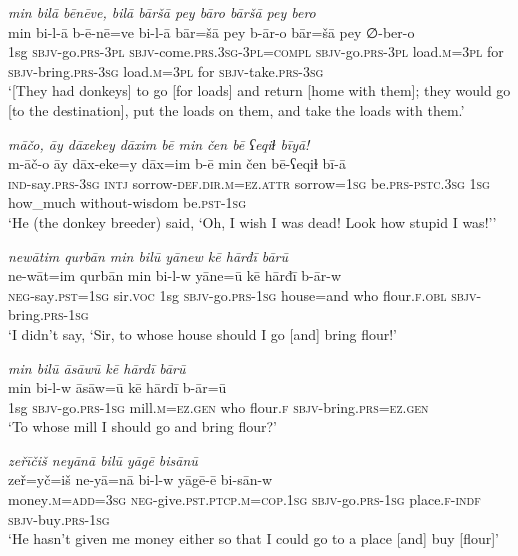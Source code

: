 \ea \label{HB.10}
\textit{min bilā bēnēve, bilā bāršā pey bāro bāršā pey bero} \\ 
\gll min bi-l-ā b-ē-nē=ve bi-l-ā bār=šā pey b-ār-o bār=šā pey ∅-ber-o \\ 
 1sg \textsc{sbjv-}go\textsc{.prs}\textsc{-3pl} \textsc{sbjv-}come\textsc{.prs}\textsc{.3sg}\textsc{-3pl}\textsc{=compl} \textsc{sbjv-}go\textsc{.prs}\textsc{-3pl} load\textsc{.m}\textsc{=3pl} for \textsc{sbjv-}bring\textsc{.prs}\textsc{-3sg} load\textsc{.m}\textsc{=3pl} for \textsc{sbjv-}take\textsc{.prs}\textsc{-3sg} \\ 
\glt `[They had donkeys] to go [for loads] and return [home with them]; they would go [to the destination], put the loads on them, and take the loads with them.'
\z 
 
\ea \label{HB.19}
\textit{māčo, āy dāxekey dāxim bē min čen bē ʕeqiɫ bīyā!} \\ 
\gll m-āč-o āy dāx-eke=y dāx=im b-ē min čen bē-ʕeqiɫ bī-ā \\ 
 \textsc{ind-}say\textsc{.prs}\textsc{-3sg} \textsc{intj} sorrow\textsc{-def}\textsc{.dir}\textsc{.m}\textsc{=ez}.\textsc{attr} sorrow\textsc{=1sg} be\textsc{.prs}\textsc{-pstc}\textsc{.3sg} \textsc{1sg} how\_much without-wisdom be\textsc{.pst}\textsc{-1sg} \\ 
\glt `He (the donkey breeder) said, ‘Oh, I wish I was dead! Look how stupid I was!’'
\z 
 
\ea \label{HB.20}
\textit{newātim qurbān min bilū yānew kē hārđī bārū} \\ 
\gll ne-wāt=im qurbān min bi-l-w yāne=ū kē hārđī b-ār-w \\ 
 \textsc{neg-}say\textsc{.pst}\textsc{=1sg} sir.\textsc{voc} 1sg \textsc{sbjv-}go\textsc{.prs}\textsc{-1sg} house=and who flour\textsc{\textsc{.f}}\textsc{.obl} \textsc{sbjv-}bring\textsc{.prs}\textsc{-1sg} \\ 
\glt `I didn’t say, ‘Sir, to whose house should I go [and] bring flour!'
\z 
 
\ea \label{HB.21}
\textit{min bilū āsāwū kē hārdī bārū} \\ 
\gll min bi-l-w āsāw=ū kē hārdī b-ār=ū \\ 
 1sg \textsc{sbjv-}go\textsc{.prs}\textsc{-1sg} mill\textsc{.m}\textsc{=ez}\textsc{.gen} who flour\textsc{\textsc{.f}} \textsc{sbjv-}bring\textsc{.prs}\textsc{=ez}\textsc{.gen} \\ 
\glt `To whose mill I should go and bring flour?'
\z 
 
\ea \label{HB.22}
\textit{zeřīčiš neyānā bilū yāgē bisānū} \\ 
\gll zeř=yč=iš ne-yā=nā bi-l-w yāgē-ē bi-sān-w \\ 
 money\textsc{.m}\textsc{=add}\textsc{=3sg} \textsc{neg-}give\textsc{.pst}\textsc{.ptcp}\textsc{.m}\textsc{=cop}\textsc{.1sg} \textsc{sbjv-}go\textsc{.prs}\textsc{-1sg} place\textsc{\textsc{.f}}\textsc{-indf} \textsc{sbjv-}buy\textsc{.prs}\textsc{-1sg} \\ 
\glt `He hasn’t given me money either so that I could go to a place [and] buy [flour]'
\z 
 
